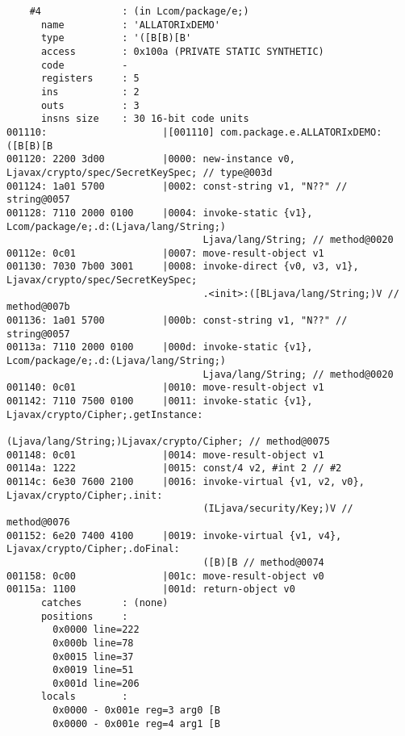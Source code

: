 \begin{lstlisting}
    #4              : (in Lcom/package/e;)
      name          : 'ALLATORIxDEMO'
      type          : '([B[B)[B'
      access        : 0x100a (PRIVATE STATIC SYNTHETIC)
      code          -
      registers     : 5
      ins           : 2
      outs          : 3
      insns size    : 30 16-bit code units
001110:                    |[001110] com.package.e.ALLATORIxDEMO:([B[B)[B
001120: 2200 3d00          |0000: new-instance v0, Ljavax/crypto/spec/SecretKeySpec; // type@003d
001124: 1a01 5700          |0002: const-string v1, "N??" // string@0057
001128: 7110 2000 0100     |0004: invoke-static {v1}, Lcom/package/e;.d:(Ljava/lang/String;)
                                  Ljava/lang/String; // method@0020
00112e: 0c01               |0007: move-result-object v1
001130: 7030 7b00 3001     |0008: invoke-direct {v0, v3, v1}, Ljavax/crypto/spec/SecretKeySpec;
                                  .<init>:([BLjava/lang/String;)V // method@007b
001136: 1a01 5700          |000b: const-string v1, "N??" // string@0057
00113a: 7110 2000 0100     |000d: invoke-static {v1}, Lcom/package/e;.d:(Ljava/lang/String;)
                                  Ljava/lang/String; // method@0020
001140: 0c01               |0010: move-result-object v1
001142: 7110 7500 0100     |0011: invoke-static {v1}, Ljavax/crypto/Cipher;.getInstance:
                                  (Ljava/lang/String;)Ljavax/crypto/Cipher; // method@0075
001148: 0c01               |0014: move-result-object v1
00114a: 1222               |0015: const/4 v2, #int 2 // #2
00114c: 6e30 7600 2100     |0016: invoke-virtual {v1, v2, v0}, Ljavax/crypto/Cipher;.init:
                                  (ILjava/security/Key;)V // method@0076
001152: 6e20 7400 4100     |0019: invoke-virtual {v1, v4}, Ljavax/crypto/Cipher;.doFinal:
                                  ([B)[B // method@0074
001158: 0c00               |001c: move-result-object v0
00115a: 1100               |001d: return-object v0
      catches       : (none)
      positions     :
        0x0000 line=222
        0x000b line=78
        0x0015 line=37
        0x0019 line=51
        0x001d line=206
      locals        :
        0x0000 - 0x001e reg=3 arg0 [B
        0x0000 - 0x001e reg=4 arg1 [B


\end{lstlisting}
